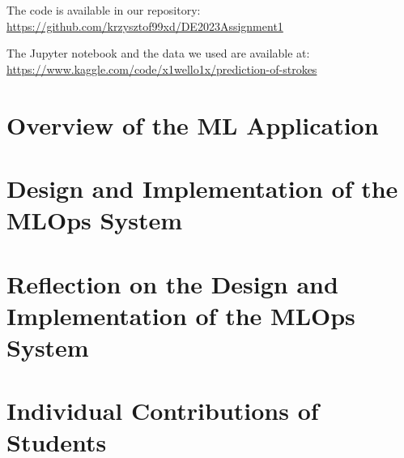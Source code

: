 \documentclass[10pt, letterpaper]{report}       %
\begin{document}

\tableofcontents

\vfill
The code is available in our repository: 
\newline \url{https://github.com/krzysztof99xd/DE2023Assignment1} 

The Jupyter notebook and the data we used are available at:
\newline \url{https://www.kaggle.com/code/x1wello1x/prediction-of-strokes}


\chapter{{Overview of the ML Application}}
\label{ch:chapter1}

\pagebreak

\chapter{Design and Implementation of the MLOps System}
\label{ch:chapter2}

\pagebreak

\chapter{Reflection on the Design and Implementation of the MLOps System}
\label{ch:chapter3}

\pagebreak

\chapter{Individual Contributions of Students}
\label{ch:chapter4}

\pagebreak



\end{document}
